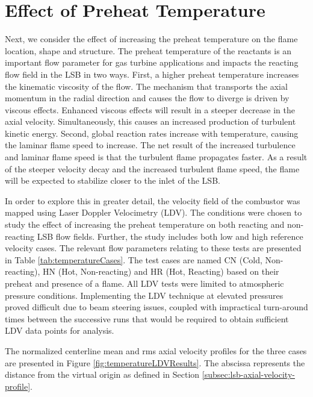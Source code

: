 \section{Effect of Preheat Temperature}
\label{sec:lsb-effect-of-preheat-temperature}





Next, we consider the effect of increasing the preheat temperature on the flame location, shape and structure.
The preheat temperature of the reactants is an important flow parameter for gas turbine applications and impacts the reacting flow field in the LSB in two ways.
First, a higher preheat temperature increases the kinematic viscosity of the flow.
The mechanism that transports the axial momentum in the radial direction and causes the flow to diverge is driven by viscous effects.
Enhanced viscous effects will result in a steeper decrease in the axial velocity.
Simultaneously, this causes an increased production of turbulent kinetic energy.
Second, global reaction rates increase with temperature, causing the laminar flame speed to increase.
The net result of the increased turbulence and laminar flame speed is that the turbulent flame propagates faster.
As a result of the steeper velocity decay and the increased turbulent flame speed, the flame will be expected to stabilize closer to the inlet of the LSB.

In order to explore this in greater detail, the velocity field of the combustor was mapped using Laser Doppler Velocimetry (LDV).
The conditions were chosen to study the effect of increasing the preheat temperature on both reacting and non-reacting LSB flow fields.
Further, the study includes both low and high reference velocity cases.
The relevant flow parameters relating to these tests are presented in Table \ref{tab:temperatureCases}.
The test cases are named CN (Cold, Non-reacting), HN (Hot, Non-reacting) and HR (Hot, Reacting) based on their preheat and presence of a flame.
All LDV tests were limited to atmospheric pressure conditions.
Implementing the LDV technique at elevated pressures proved difficult due to beam steering issues, coupled with impractical turn-around times between the successive runs that would be required to obtain sufficient LDV data points for analysis.

The normalized centerline mean and rms axial velocity profiles for the three cases are presented in Figure \ref{fig:temperatureLDVResults}.
The abscissa represents the distance from the virtual origin as defined in Section \ref{subsec:lsb-axial-velocity-profile}.

